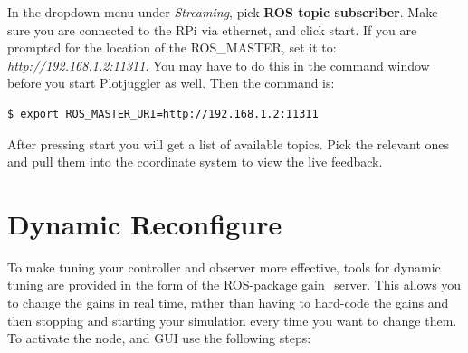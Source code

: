 \documentclass{ol-softwaremanual}
\begin{document}
In the dropdown menu under \textit{Streaming}, pick \textbf{ROS topic subscriber}. Make sure you are connected to the RPi via ethernet, and click start. If you are prompted for the location of the ROS\_MASTER, set it to: \textit{http://192.168.1.2:11311}. You may have to do this in the command window before you start Plotjuggler as well. Then the command is: 

\begin{lstlisting}[language=bash,basicstyle=\mlttfamily, breaklines=true]
  $ export ROS_MASTER_URI=http://192.168.1.2:11311
\end{lstlisting}

After pressing start you will get a list of available topics. Pick the relevant ones and pull them into the coordinate system to view the live feedback. 

\section{Dynamic Reconfigure}

To make tuning your controller and observer more effective, tools for dynamic tuning are provided in the form of the ROS-package gain\_server. This allows you to change the gains in real time, rather than having to hard-code the gains and then stopping and starting your simulation every time you want to change them. To activate the node, and GUI use the following steps: 
\end{document}
